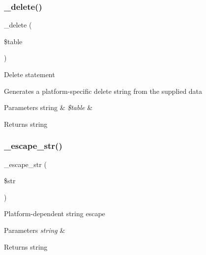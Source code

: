\subsubsection{\texorpdfstring{\+\_\+delete()}{\_delete()}}
{\footnotesize\ttfamily \+\_\+delete (\begin{DoxyParamCaption}\item[{}]{\$table }\end{DoxyParamCaption})\hspace{0.3cm}{\ttfamily [protected]}}

Delete statement

Generates a platform-\/specific delete string from the supplied data


\begin{DoxyParams}[1]{Parameters}
string & {\em \$table} & \\
\hline
\end{DoxyParams}
\begin{DoxyReturn}{Returns}
string 
\end{DoxyReturn}
\mbox{\label{class_c_i___d_b__postgre__driver_af8ef0237bfcdb19215b63fff769e7a55}} 
\subsubsection{\texorpdfstring{\+\_\+escape\+\_\+str()}{\_escape\_str()}}
{\footnotesize\ttfamily \+\_\+escape\+\_\+str (\begin{DoxyParamCaption}\item[{}]{\$str }\end{DoxyParamCaption})\hspace{0.3cm}{\ttfamily [protected]}}

Platform-\/dependent string escape


\begin{DoxyParams}{Parameters}
{\em string} & \\
\hline
\end{DoxyParams}
\begin{DoxyReturn}{Returns}
string 
\end{DoxyReturn}
\mbox{\label{class_c_i___d_b__postgre__driver_a114ab675d89bf8324a41785fb475e86d}} 
